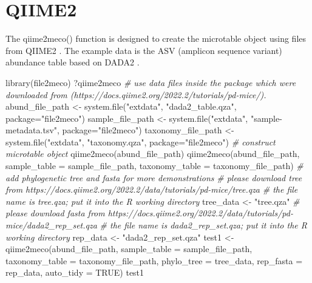 \documentclass[
]{book}
\newenvironment{Shaded}{\begin{snugshade}}{\end{snugshade}}
\newcommand{\AttributeTok}[1]{\textcolor[rgb]{0.77,0.63,0.00}{#1}}
\newcommand{\CommentTok}[1]{\textcolor[rgb]{0.56,0.35,0.01}{\textit{#1}}}
\newcommand{\ConstantTok}[1]{\textcolor[rgb]{0.00,0.00,0.00}{#1}}
\newcommand{\FunctionTok}[1]{\textcolor[rgb]{0.00,0.00,0.00}{#1}}
\newcommand{\NormalTok}[1]{#1}
\newcommand{\OtherTok}[1]{\textcolor[rgb]{0.56,0.35,0.01}{#1}}
\newcommand{\StringTok}[1]{\textcolor[rgb]{0.31,0.60,0.02}{#1}}
\begin{document}
\hypertarget{qiime2}{%
\section{QIIME2}\label{qiime2}}

The qiime2meco() function is designed to create the microtable object using files from QIIME2 \citep{Bolyen_Reproducible_2019}.
The example data is the ASV (amplicon sequence variant) abundance table based on DADA2 \citep{Callahan_DADA2_2016}.

\begin{Shaded}
\begin{Highlighting}[]
\FunctionTok{library}\NormalTok{(file2meco)}
\NormalTok{?qiime2meco}
\CommentTok{\# use data files inside the package which were downloaded from (https://docs.qiime2.org/2022.2/tutorials/pd{-}mice/).}
\NormalTok{abund\_file\_path }\OtherTok{\textless{}{-}} \FunctionTok{system.file}\NormalTok{(}\StringTok{"extdata"}\NormalTok{, }\StringTok{"dada2\_table.qza"}\NormalTok{, }\AttributeTok{package=}\StringTok{"file2meco"}\NormalTok{)}
\NormalTok{sample\_file\_path }\OtherTok{\textless{}{-}} \FunctionTok{system.file}\NormalTok{(}\StringTok{"extdata"}\NormalTok{, }\StringTok{"sample{-}metadata.tsv"}\NormalTok{, }\AttributeTok{package=}\StringTok{"file2meco"}\NormalTok{)}
\NormalTok{taxonomy\_file\_path }\OtherTok{\textless{}{-}} \FunctionTok{system.file}\NormalTok{(}\StringTok{"extdata"}\NormalTok{, }\StringTok{"taxonomy.qza"}\NormalTok{, }\AttributeTok{package=}\StringTok{"file2meco"}\NormalTok{)}
\CommentTok{\# construct microtable object}
\FunctionTok{qiime2meco}\NormalTok{(abund\_file\_path)}
\FunctionTok{qiime2meco}\NormalTok{(abund\_file\_path, }\AttributeTok{sample\_table =}\NormalTok{ sample\_file\_path, }\AttributeTok{taxonomy\_table =}\NormalTok{ taxonomy\_file\_path)}
\CommentTok{\# add phylogenetic tree and fasta for more demonstrations}
\CommentTok{\# please download tree from https://docs.qiime2.org/2022.2/data/tutorials/pd{-}mice/tree.qza}
\CommentTok{\# the file name is \textquotesingle{}tree.qza\textquotesingle{}; put it into the R working directory}
\NormalTok{tree\_data }\OtherTok{\textless{}{-}} \StringTok{"tree.qza"}
\CommentTok{\# please download fasta from https://docs.qiime2.org/2022.2/data/tutorials/pd{-}mice/dada2\_rep\_set.qza}
\CommentTok{\# the file name is \textquotesingle{}dada2\_rep\_set.qza\textquotesingle{}; put it into the R working directory}
\NormalTok{rep\_data }\OtherTok{\textless{}{-}} \StringTok{"dada2\_rep\_set.qza"}
\NormalTok{test1 }\OtherTok{\textless{}{-}} \FunctionTok{qiime2meco}\NormalTok{(abund\_file\_path, }\AttributeTok{sample\_table =}\NormalTok{ sample\_file\_path, }\AttributeTok{taxonomy\_table =}\NormalTok{ taxonomy\_file\_path, }\AttributeTok{phylo\_tree =}\NormalTok{ tree\_data, }\AttributeTok{rep\_fasta =}\NormalTok{ rep\_data, }\AttributeTok{auto\_tidy =} \ConstantTok{TRUE}\NormalTok{)}
\NormalTok{test1}
\end{Highlighting}
\end{Shaded}
\end{document}
